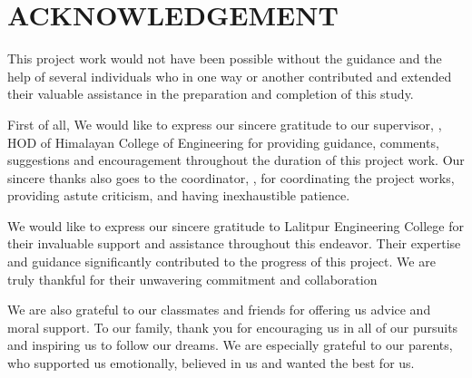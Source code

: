 
\section*{ACKNOWLEDGEMENT}

\justify
This project work would not have been possible without the guidance and the help of
several individuals who in one way or another contributed and extended their
valuable assistance in the preparation and completion of this study.


\noindent First of all, We would like to express our sincere gratitude to our supervisor, \textbf{\thesupervisor}, HOD of Himalayan College of Engineering for providing  guidance, comments, suggestions and encouragement throughout the duration of
this project work. Our sincere thanks also goes to the coordinator, \textbf{\theprogramcoordinator}, for coordinating the project works, providing astute criticism, and having
inexhaustible patience.

\noindent We would like to express our sincere gratitude to Lalitpur Engineering College for their invaluable support and assistance throughout this endeavor. Their expertise and guidance significantly contributed to the progress of this project. We are truly thankful for their unwavering commitment and collaboration

\noindent We are also grateful to our classmates and friends for offering us advice and moral
support. To our family, thank you for encouraging us in all of our pursuits and
inspiring us to follow our dreams. We are especially grateful to our parents, who
supported us emotionally, believed in us and wanted the best for us.

\vspace{0.3in}
\noindent {\theauthorsmall}



